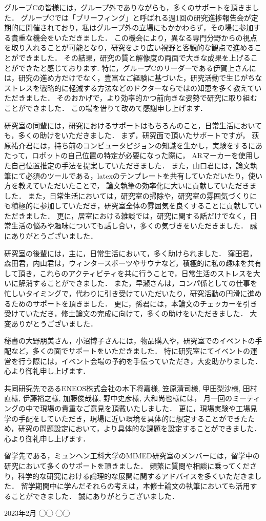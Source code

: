 \documentclass[../main]{subfiles}
\begin{document}
グループCの皆様には，グループ外でありながらも，多くのサポートを頂きました．
グループCでは「ブリーフィング」と呼ばれる週1回の研究進捗報告会が定期的に開催されており，私はグループ外の立場にもかかわらず，その場に参加する貴重な機会をいただきました．
この機会により，異なる専門分野からの視点を取り入れることが可能となり，研究をより広い視野と客観的な観点で進めることができました．
その結果，研究の質と解像度の両面で大きな成果を上げることができたと感じております.
特に，グループCのリーダーである伊賀上さんには，研究の進め方だけでなく，豊富なご経験に基づいた，研究活動で生じがちなストレスを戦略的に軽減する方法などのドクターならではの知恵を多く教えていただきました．
そのおかげで，より効率的かつ前向きな姿勢で研究に取り組むことができました．
この場を借りて改めて感謝申し上げます．

研究室の同輩には，研究におけるサポートはもちろんのこと，日常生活においても，多くの助けをいただきました．
まず，研究面で頂いたサポートですが，
荻原祐介君には，持ち前のコンピュータビジョンの知識を生かし，実験をするにあたって，ロボットの自己位置の特定が必要になった際に，
ARマーカーを使用した自己位置推定の手法を提案していただきました．
また，山口君には，論文執筆にて必須のツールである，latexのテンプレートを共有していただいたり，使い方を教えていただいたことで，
論文執筆の効率化に大いに貢献していただきました．
また，日常生活においては，研究室の掃除や，研究室の雰囲気づくりにも積極的に参加していただき，研究室全体の雰囲気を良くすることに貢献していただきました．
更に，居室における雑談では，研究に関する話だけでなく，日常生活の悩みや趣味についても話し合い，多くの気づきをいただきました．
誠にありがとうございました．

研究室の後輩には，主に，日常生活において，多く助けられました．
窪田君，森田君，内山君は，ウィンタースポーツやサウナなど，積極的に私の趣味を共有して頂き，これらのアクティビティを共に行うことで，日常生活のストレスを大いに解消することができました．
また，早瀬さんは，コンパ係としての仕事を忙しいタイミングで，代わりに引き受けていただいたり，研究活動の円滑に進めるためのサポートを頂きました．
更に，孫君には，本論文のチェッカーを引き受けていただき，修士論文の完成に向けて，多くの助けをいただきました．
大変ありがとうございました．


秘書の大野朋美さん，小沼博子さんには，物品購入や，研究室でのイベントの手配など，多くの面でサポートをいただきました．
特に研究室にてイベントの運営を行う際には，イベント会場の予約を手伝っていただき，大変助かりました．
心より御礼申し上げます．

共同研究先であるENEOS株式会社の木下将嘉様, 笠原清司様, 甲田梨沙様, 田村直様, 伊藤裕之様, 加藤俊哉様, 野中史彦様, 大和尚也様には，
月一回のミーティングの中で現場の貴重なご意見を頂戴いたしました．
更に，現場実験や工場見学の手配をしていただき，現場に近い環境を具体的に想定することができたため，研究の問題設定において，より具体的な課題を設定することができました．
心より御礼申し上げます．

留学先である，ミュンヘン工科大学のMIMED研究室のメンバーには，留学中の研究において多くのサポートを頂きました．
頻繁に質問や相談に乗ってくださり，科学的な研究における論理的な展開に関するアドバイスを多くいただきました．
留学期間中に学んだそれらの考えは，本修士論文の執筆においても活用することができました．
誠にありがとうございました．

\begin{flushright}
  2023年2月 ◯◯ ◯◯
\end{flushright}
\end{document}
